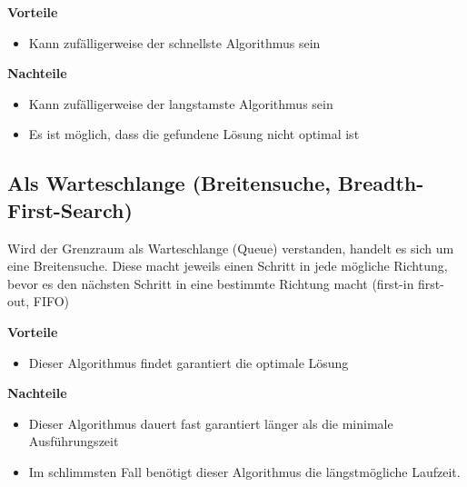 \textbf{Vorteile}
\begin{itemize}
 \item Kann zufälligerweise der schnellste Algorithmus sein
\end{itemize}

\textbf{Nachteile}
\begin{itemize}
 \item Kann zufälligerweise der langstamste Algorithmus sein
 \item Es ist möglich, dass die gefundene Lösung nicht optimal ist
\end{itemize}
%    

\subsection{Als Warteschlange (Breitensuche, Breadth-First-Search)}

Wird der Grenzraum als Warteschlange (Queue) verstanden, handelt es sich um eine Breitensuche. Diese macht jeweils einen Schritt in jede mögliche Richtung, bevor es den nächsten Schritt in eine bestimmte Richtung macht (first-in first-out, FIFO)

\textbf{Vorteile}
\begin{itemize}
 \item Dieser Algorithmus findet garantiert die optimale Lösung
\end{itemize}

\textbf{Nachteile}
\begin{itemize}
 \item Dieser Algorithmus dauert fast garantiert länger als die minimale Ausführungszeit
 \item Im schlimmsten Fall benötigt dieser Algorithmus die längstmögliche Laufzeit.
\end{itemize}

%    

